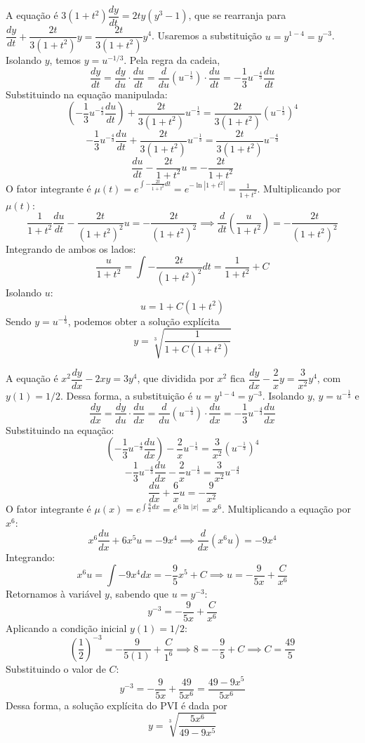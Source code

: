 \documentclass[oneside,12pt,a4paper]{report}
\begin{document}
\begin{resolucao}
        \itemresolucao A equação é $3(1+t^2)\dfrac{dy}{dt}=2ty(y^3-1)$, que se rearranja para $\dfrac{dy}{dt}+\dfrac{2t}{3(1+t^2)}y=\dfrac{2t}{3(1+t^2)}y^4$. Usaremos a substituição $u=y^{1-4}=y^{-3}$. Isolando $y$, temos $y=u^{-1/3}$.
        Pela regra da cadeia,
        \[\frac{dy}{dt}=\frac{dy}{du}\cdot\frac{du}{dt} = \frac{d}{du}(u^{-\frac{1}{3}})\cdot\frac{du}{dt} = -\frac{1}{3}u^{-\frac{4}{3}}\frac{du}{dt}\]
        Substituindo na equação manipulada:
        \[\left(-\frac{1}{3}u^{-\frac{4}{3}}\frac{du}{dt}\right) + \frac{2t}{3(1+t^2)}u^{-\frac{1}{3}} = \frac{2t}{3(1+t^2)}(u^{-\frac{1}{3}})^4\]
        \[-\frac{1}{3}u^{-\frac{4}{3}}\frac{du}{dt} + \frac{2t}{3(1+t^2)}u^{-\frac{1}{3}} = \frac{2t}{3(1+t^2)}u^{-\frac{4}{3}}\]
        \[\frac{du}{dt}-\frac{2t}{1+t^2}u=-\frac{2t}{1+t^2}\]
        O fator integrante é $\mu(t)=e^{\int -\frac{2t}{1+t^2}dt}=e^{-\ln|1+t^2|}=\frac{1}{1+t^2}$. Multiplicando por $\mu(t)$:
        \[\frac{1}{1+t^2}\frac{du}{dt}-\frac{2t}{(1+t^2)^2}u=-\frac{2t}{(1+t^2)^2} \implies \frac{d}{dt}\left(\frac{u}{1+t^2}\right)=-\frac{2t}{(1+t^2)^2}\]
        Integrando de ambos os lados:
        \[\frac{u}{1+t^2} = \int -\frac{2t}{(1+t^2)^2}dt = \frac{1}{1+t^2}+C\]
        Isolando $u$:
        \[u = 1+C(1+t^2)\]
        Sendo $y=u^{-\frac{1}{3}}$, podemos obter a solução explícita
        \[\boxed{y=\sqrt[3]{\frac{1}{1+C(1+t^2)}}}\]

        \itemresolucao A equação é $x^2\dfrac{dy}{dx}-2xy=3y^4$, que dividida por $x^2$ fica $\dfrac{dy}{dx}-\dfrac{2}{x}y=\dfrac{3}{x^2}y^4$, com $y(1)=1/2$. Dessa forma, a substituição é $u=y^{1-4}=y^{-3}$. Isolando $y$, $y=u^{-\frac{1}{3}}$ e
        \[\frac{dy}{dx}=\frac{dy}{du}\cdot\frac{du}{dx} = \frac{d}{du}(u^{-\frac{1}{3}})\cdot\frac{du}{dx} = -\frac{1}{3}u^{-\frac{4}{3}}\frac{du}{dx}\]
        Substituindo na equação:
        \[\left(-\frac{1}{3}u^{-\frac{4}{3}}\frac{du}{dx}\right) - \frac{2}{x}u^{-\frac{1}{3}} = \frac{3}{x^2}(u^{-\frac{1}{3}})^4\]
        \[-\frac{1}{3}u^{-\frac{4}{3}}\frac{du}{dx} - \frac{2}{x}u^{-\frac{1}{3}} = \frac{3}{x^2}u^{-\frac{4}{3}}\]
        \[\frac{du}{dx}+\frac{6}{x}u=-\frac{9}{x^2}\]
        O fator integrante é $\mu(x)=e^{\int \frac{6}{x}dx}=e^{6\ln|x|}=x^6$. Multiplicando a equação por $x^6$:
        \[x^6\frac{du}{dx}+6x^5u=-9x^4 \implies \frac{d}{dx}(x^6u)=-9x^4\]
        Integrando:
        \[x^6u = \int -9x^4dx = -\frac{9}{5}x^5+C \implies u = -\frac{9}{5x}+\frac{C}{x^6}\]
        Retornamos à variável $y$, sabendo que $u=y^{-3}$:
        \[y^{-3} = -\frac{9}{5x}+\frac{C}{x^6}\]
        Aplicando a condição inicial $y(1)=1/2$:
        \[\left(\frac{1}{2}\right)^{-3} = -\frac{9}{5(1)}+\frac{C}{1^6} \implies 8 = -\frac{9}{5}+C \implies C = \frac{49}{5}\]
        Substituindo o valor de $C$:
        \[y^{-3} = -\frac{9}{5x}+\frac{49}{5x^6} = \frac{49-9x^5}{5x^6}\]
        Dessa forma, a solução explícita do PVI é dada por
        \[\boxed{y=\sqrt[3]{\frac{5x^6}{49-9x^5}}}\]
    \end{resolucao}
\end{document}
